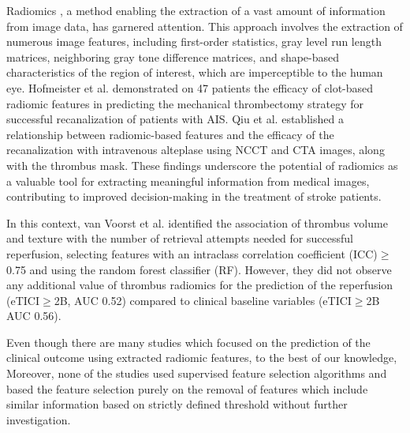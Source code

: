 \documentclass[preprint,12pt]{elsarticle}
\begin{document}
Radiomics , a method enabling the extraction of a vast amount of information from image data, has garnered attention. This approach involves the extraction of numerous image features, including first-order statistics, gray level run length matrices, neighboring gray tone difference matrices, and shape-based characteristics of the region of interest, which are imperceptible to the human eye. 
Hofmeister et al. \cite{Hofmeister2020} demonstrated on 47 patients the efficacy of clot-based radiomic features in predicting the mechanical thrombectomy strategy for successful recanalization of patients with AIS. 
Qiu et al. \cite{Qiu2018} established a relationship between radiomic-based features and the efficacy of the recanalization with intravenous alteplase using NCCT and CTA images, along with the thrombus mask. These findings underscore the potential of radiomics as a valuable tool for extracting meaningful information from medical images, contributing to improved decision-making in the treatment of stroke patients. 


In this context, van Voorst et al. \cite{vanVoorst2022} identified the association of thrombus volume and texture with the number of retrieval attempts needed for successful reperfusion, selecting features with an intraclass correlation coefficient (ICC)$\geq$0.75 and using the random forest classifier (RF). However, they did not observe any additional value of thrombus radiomics for the prediction of the reperfusion (eTICI$\geq$2B, AUC 0.52) compared to clinical baseline variables (eTICI$\geq$2B AUC 0.56). 


Even though there are many studies which focused on the prediction of the clinical outcome using extracted radiomic features, to the best of our knowledge,  Moreover, none of the studies used supervised feature selection algorithms and based the feature selection purely on the removal of features which include similar information based on strictly defined threshold without further investigation.   
\end{document}
